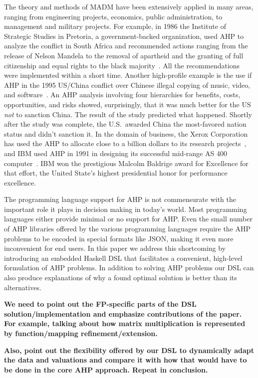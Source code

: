 \documentclass{jfp}
\newcommand{\NOTE}[2][gray]{\smallskip\noindent
  \colorbox{#1!30}{\parbox{.98\linewidth}{{\small\textbf{#2}}}}
}
\begin{document}
The theory and methods of MADM have been extensively applied in many areas, ranging from engineering projects, economics, public administration, to management and military projects.
%
For example, in 1986 the Institute of Strategic Studies in Pretoria, a government-backed organization, used AHP to analyze the conflict in South Africa and recommended actions ranging from the release of Nelson Mandela to the removal of apartheid and the granting of full citizenship and equal rights to the black majority~\citep{articleSaatySA}. All the recommendations were implemented within a short time. Another high-profile example is the use if AHP in the 1995 US/China conflict over Chinese illegal copying of music, video, and software~\citep{SAATY2001243}. An AHP analysis involving four hierarchies for benefits, costs, opportunities, and risks showed, surprisingly, that it was much better for the US \emph{not} to sanction China. The result of the study predicted what happened. Shortly after the study was complete, the U.S.\ awarded China the most-favored nation status and didn't sanction it.
%
In the domain of business, the Xerox Corporation has used the AHP to allocate close to a billion dollars to its research projects~\citep{Saaty2002DECISIONMW}, and IBM used AHP in 1991 in designing its successful mid-range AS 400 computer~\citep{TANG199222}. IBM won the prestigious Malcolm Baldrige award for Excellence for that effort, the United State's highest presidential honor for performance excellence.

The programming language support for AHP is not commensurate with the important role it plays in decision making in today's world. Most programming languages either provide minimal or no support for AHP. Even the small number of AHP libraries offered by the various programming languages require the AHP problems to be encoded in special formats like JSON, making it even more inconvenient for end users. 
%
In this paper we address this shortcoming by introducing an embedded Haskell DSL that facilitates a convenient, high-level formulation of AHP problems. In addition to solving AHP problems our DSL can also produce explanations of why a found optimal solution is better than its alternatives.

\NOTE{We need to point out the FP-specific parts of the DSL solution/implementation and emphasize contributions of the paper. For example, talking about how matrix multiplication is represented by function/mapping refinement/extension.}


\NOTE{Also, point out the flexibility offered by our DSL to dynamically adapt the data and valuations and compare it with how that would have to be done in the core AHP approach. Repeat in conclusion.}
\end{document}
